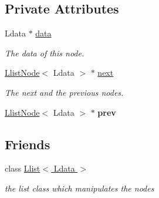 \subsection*{Private Attributes}
\begin{CompactItemize}
\item 
\hypertarget{classLlistNode_f6147c63bdee0e7d19323ee2c8390755}{
Ldata $\ast$ \hyperlink{classLlistNode_f6147c63bdee0e7d19323ee2c8390755}{data}}
\label{classLlistNode_f6147c63bdee0e7d19323ee2c8390755}

\begin{CompactList}\small\item\em The data of this node. \item\end{CompactList}\item 
\hypertarget{classLlistNode_06cabe26723b810e801708ef9660f556}{
\hyperlink{classLlistNode}{LlistNode}$<$ Ldata $>$ $\ast$ \hyperlink{classLlistNode_06cabe26723b810e801708ef9660f556}{next}}
\label{classLlistNode_06cabe26723b810e801708ef9660f556}

\begin{CompactList}\small\item\em The next and the previous nodes. \item\end{CompactList}\item 
\hypertarget{classLlistNode_445540ddfb7fe610b13ebe59312b8545}{
\hyperlink{classLlistNode}{LlistNode}$<$ Ldata $>$ $\ast$ \textbf{prev}}
\label{classLlistNode_445540ddfb7fe610b13ebe59312b8545}

\end{CompactItemize}
\subsection*{Friends}
\begin{CompactItemize}
\item 
\hypertarget{classLlistNode_59c8480ff68562e8cfa2bc1285d79b77}{
class \hyperlink{classLlistNode_59c8480ff68562e8cfa2bc1285d79b77}{Llist$<$ Ldata $>$}}
\label{classLlistNode_59c8480ff68562e8cfa2bc1285d79b77}

\begin{CompactList}\small\item\em the list class which manipulates the nodes \item\end{CompactList}\end{CompactItemize}


